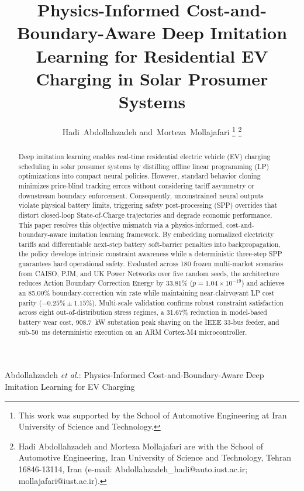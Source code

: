 \documentclass[journal]{IEEEtran}
\theoremstyle{remark}
\begin{document}
\title{Physics-Informed Cost-and-Boundary-Aware Deep Imitation Learning for Residential EV Charging in Solar Prosumer Systems}

\author{Hadi~Abdollahzadeh and~Morteza~Mollajafari%
\thanks{This work was supported by the School of Automotive Engineering at Iran University of Science and Technology.}%
\thanks{Hadi Abdollahzadeh and Morteza Mollajafari are with the School of Automotive Engineering, Iran University of Science and Technology, Tehran 16846-13114, Iran (e-mail: Abdollahzadeh\_hadi@auto.iust.ac.ir; mollajafari@iust.ac.ir).}}

%
{Abdollahzadeh \MakeLowercase{\textit{et al.}}: Physics-Informed Cost-and-Boundary-Aware Deep Imitation Learning for EV Charging}

\maketitle

\begin{abstract}
Deep imitation learning enables real-time residential electric vehicle (EV) charging scheduling in solar prosumer systems by distilling offline linear programming (LP) optimizations into compact neural policies. However, standard behavior cloning minimizes price-blind tracking errors without considering tariff asymmetry or downstream boundary enforcement. Consequently, unconstrained neural outputs violate physical battery limits, triggering safety post-processing (SPP) overrides that distort closed-loop State-of-Charge trajectories and degrade economic performance. This paper resolves this objective mismatch via a physics-informed, cost-and-boundary-aware imitation learning framework. By embedding normalized electricity tariffs and differentiable next-step battery soft-barrier penalties into backpropagation, the policy develops intrinsic constraint awareness while a deterministic three-step SPP guarantees hard operational safety. Evaluated across 180 frozen multi-market scenarios from CAISO, PJM, and UK Power Networks over five random seeds, the architecture reduces Action Boundary Correction Energy by 33.81\% ($p = 1.04 \times 10^{-19}$) and achieves an 85.00\% boundary-correction win rate while maintaining near-clairvoyant LP cost parity ($-0.25\% \pm 1.15\%$). Multi-scale validation confirms robust constraint satisfaction across eight out-of-distribution stress regimes, a 31.67\% reduction in model-based battery wear cost, 908.7~kW substation peak shaving on the IEEE 33-bus feeder, and sub-50~ms deterministic execution on an ARM Cortex-M4 microcontroller.
\end{abstract}
\end{document}
